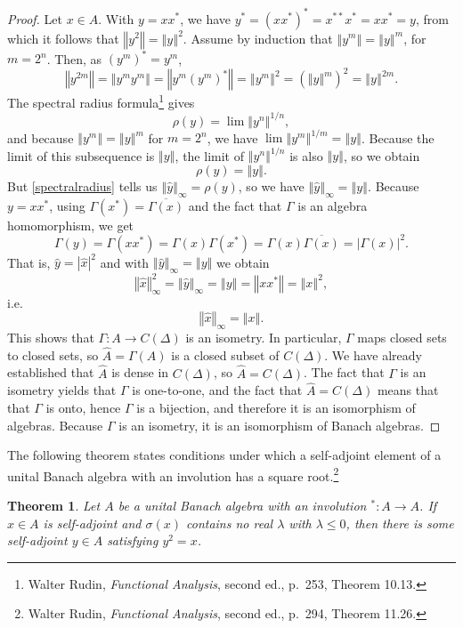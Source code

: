 \documentclass{article}
\newcommand{\norm}[1]{\left\Vert #1 \right\Vert}
\newtheorem{theorem}{Theorem}
\theoremstyle{definition}
\begin{document}
\begin{proof}
Let $x \in A$. With $y=xx^*$, we have $y^*=(xx^*)^*=x^{**}x^*=xx^*=y$, from which it follows that $\norm{y^2}=\norm{y}^2$. 
Assume by induction that $\norm{y^m}=\norm{y}^m$, for $m=2^n$. Then, as $(y^m)^*=y^m$,
\[
\norm{y^{2m}} = \norm{y^m y^m}= \norm{y^m (y^m)^*} = \norm{y^m}^2 = (\norm{y}^m)^2 = \norm{y}^{2m}.
\]
The spectral radius formula\footnote{Walter Rudin, {\em Functional Analysis}, second ed., p.~253, Theorem 10.13.}
gives
\[
\rho(y) = \lim \norm{y^n}^{1/n},
\]
and because $\norm{y^m}=\norm{y}^m$ for $m=2^n$, we have $\lim \norm{y^m}^{1/m} = \norm{y}$. Because the limit of this subsequence
is $\norm{y}$, the limit of $\norm{y^n}^{1/n}$ is also $\norm{y}$, so we obtain
\[
\rho(y)=\norm{y}.
\]
But \eqref{spectralradius} tells us $\norm{\hat{y}}_\infty=\rho(y)$, so we have
$\norm{\hat{y}}_\infty=\norm{y}$.
Because $y=xx^*$, using $\Gamma(x^*)=\overline{\Gamma(x)}$ and the fact that $\Gamma$ is an algebra homomorphism, we get 
\[
\Gamma(y)=\Gamma(xx^*)=\Gamma(x)\Gamma(x^*)=\Gamma(x)\overline{\Gamma(x)}=|\Gamma(x)|^2.
\]
That is, $\hat{y}=|\hat{x}|^2$ and with $\norm{\hat{y}}_\infty=\norm{y}$ we obtain
\[
\norm{\hat{x}}_\infty^2 = \norm{\hat{y}}_\infty = \norm{y} = \norm{xx^*} = \norm{x}^2,
\] 
i.e.
\[
\norm{\hat{x}}_\infty = \norm{x}.
\]
 This shows that
$\Gamma:A \to C(\Delta)$ is an isometry. In particular, $\Gamma$ maps closed sets to closed sets,
so $\widehat{A}=\Gamma(A)$ is a closed subset of $C(\Delta)$. We have already established that
$\widehat{A}$ is dense in $C(\Delta)$, so $\widehat{A}=C(\Delta)$. The fact that 
$\Gamma$ is an isometry yields that $\Gamma$ is one-to-one, and the fact that
$\widehat{A}=C(\Delta)$ means that
that $\Gamma$ is onto, hence $\Gamma$ is a bijection, and therefore it is an isomorphism of algebras. Because
$\Gamma$ is an isometry, it is an isomorphism of Banach algebras.
\end{proof}


The following theorem states conditions under which a self-adjoint element of a  
unital Banach algebra with an involution has a square root.\footnote{Walter Rudin, {\em Functional Analysis}, second ed., p.~294, Theorem 11.26.}


\begin{theorem}
Let $A$ be a  unital Banach algebra with an involution $^*:A \to A$. If $x \in A$ is self-adjoint
and $\sigma(x)$ contains no real $\lambda$ with $\lambda \leq 0$, then there is some self-adjoint $y \in A$ satisfying
$y^2=x$.
\label{squareroot}
\end{theorem}
\end{document}

